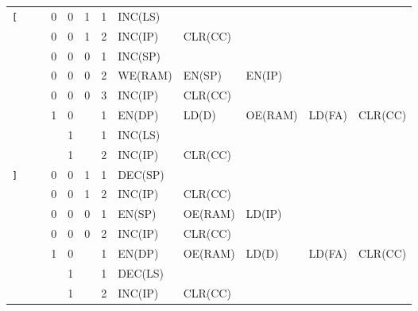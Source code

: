 \begin{footnotesize}
\begin{longtable}[c] {c|ccccc|c|lllll}
    \rowcolor{Gray}  \texttt{[}   &   &   & 0 & 0     & 1    & 1     & INC(LS)  &          &         &        &                \\
    \rowcolor{Gray}               &   &   & 0 & 0     & 1    & 2     & INC(IP)  & CLR(CC)   &         &        &                \\      
    \rowcolor{White}              &   &   & 0 & 0     & 0    & 1     & INC(SP)  &          &         &        &                \\
    \rowcolor{White}              &   &   & 0 & 0     & 0    & 2     & WE(RAM)  & EN(SP)   & EN(IP)  &        &                \\
    \rowcolor{White}              &   &   & 0 & 0     & 0    & 3     & INC(IP)  & CLR(CC)   &         &        &                \\
    \rowcolor{Gray}               &   &   & 1 & 0     &      & 1     & EN(DP)   & LD(D)    & OE(RAM) & LD(FA) & CLR(CC)         \\
    \rowcolor{White}              &   &   &   & 1     &      & 1     & INC(LS)  &          &         &        &                \\
    \rowcolor{White}              &   &   &   & 1     &      & 2     & INC(IP)  & CLR(CC)   &         &        &                \\ \hline
    
    \rowcolor{Gray} \texttt{]}   &   &   & 0 & 0     & 1    & 1     & DEC(SP)  &          &         &        &                \\
    \rowcolor{Gray}              &   &   & 0 & 0     & 1    & 2     & INC(IP)  & CLR(CC)   &         &        &                \\
        
    \rowcolor{White}               &   &   & 0 & 0     & 0    & 1     & EN(SP)   & OE(RAM)  & LD(IP)  &        &                \\
    \rowcolor{White}               &   &   & 0 & 0     & 0    & 2     & INC(IP)  & CLR(CC)   &         &        &                \\
    \rowcolor{Gray}              &   &   & 1 & 0     &      & 1     & EN(DP)   & OE(RAM)  & LD(D)   & LD(FA) & CLR(CC)         \\
    \rowcolor{White}               &   &   &   & 1     &      & 1     & DEC(LS)  &          &         &        &                \\ 
    \rowcolor{White}               &   &   &   & 1     &      & 2     & INC(IP)  & CLR(CC)   &         &        &                \\ \hline


\end{longtable}
\end{footnotesize}
